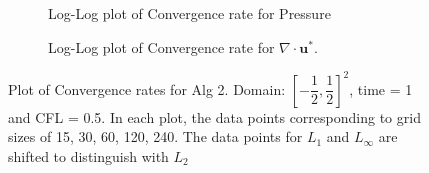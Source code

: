 \begin{figure}[H]
	\centering
	\begin{subfigure}[t]{4.5in}
		\centering
		\caption{Log-Log plot of Convergence rate for Pressure}\label{fig:6.8a}		
	\end{subfigure}
	\quad
	\begin{subfigure}[t]{4.5in}
		\centering
		\caption{Log-Log plot of Convergence rate for $\nabla \cdot \textbf{u}^*$. }\label{fig:6.8b}
	\end{subfigure}
	\caption{Plot of Convergence rates for Alg 2. Domain:  $[-\dfrac{1}{2}, \dfrac{1}{2}]^2$, time = 1 and CFL = 0.5. In each plot, the data points corresponding to grid sizes of 15, 30, 60, 120, 240. The data points for $L_1$ and $L_\infty$ are shifted to distinguish with $L_2$}\label{fig:6.8}
\end{figure}

